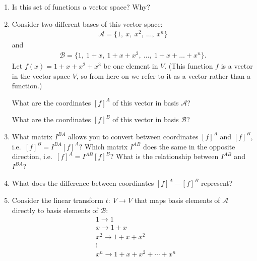 \begin{enumerate}
\item Is this set of functions a vector space? Why?



\item Consider two different bases of this vector space: 
\begin{align*}
  \mathcal{A} = \{1,\ x,\ x^2,\ \ldots,\ x^n\}
\end{align*}
and 
\begin{align*}
  \mathcal{B} = \{1,\ 1 + x,\ 1 + x + x^2,\ \ldots,\ 1 + x + \ldots + x^n\}.
\end{align*}
Let $f(x) = 1 + x + x^2 + x^3$ be one element in $V$. (This function $f$ is a vector in the
  vector space $V$, so from here on we refer to it as a vector rather
than a function.)

What are the coordinates $[f]^A$ of this vector in basis $\mathcal{A}$?

What are the coordinates $[f]^B$ of this vector in basis $\mathcal{B}$?


\item What matrix $I^{BA}$ allows you to convert between coordinates $[f]^A$ and
  $[f]^B$, i.e.\ $[f]^B = I^{BA} [f]^A$?  Which matrix $I^{AB}$ does the same
  in the opposite direction, i.e.\ $[f]^A = I^{AB} [f]^B$?  What is the
  relationship between $I^{AB}$ and $I^{BA}$?


\item What does the difference between coordinates $[f]^A - [f]^B$
        represent?


\item Consider the linear transform $t:~ V \to V$ that maps basis elements of $\mathcal{A}$ directly to basis elements of 
$\mathcal{B}$:
\begin{align*}
  &1 \rightarrow 1 \\
  &x \rightarrow 1 + x \\
  &x^2 \rightarrow 1 + x + x^2 \\
  &\vdots \\
  &x^n \rightarrow 1 + x + x^2 + \cdots + x^n 
\end{align*}


\end{enumerate}
